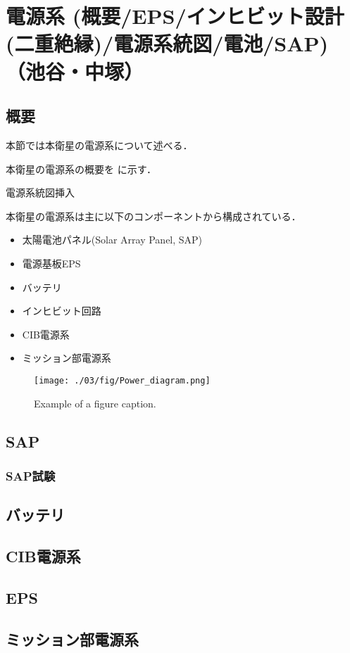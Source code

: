 \section{電源系 (概要/EPS/インヒビット設計(二重絶縁)/電源系統図/電池/SAP)（池谷・中塚）}
\subsection{概要}
本節では本衛星の電源系について述べる．

本衛星の電源系の概要を
に示す．

電源系統図挿入

本衛星の電源系は主に以下のコンポーネントから構成されている．
\begin{itemize}
	\item 太陽電池パネル(Solar Array Panel, SAP)
	\item 電源基板EPS
	\item バッテリ
	\item インヒビット回路
	\item CIB電源系
	\item ミッション部電源系
\end{itemize}


\begin{landscape}
\begin{figure}[htbp]
	\begin{center}
		\texttt{[image: ./03/fig/Power\_diagram.png]}
		\caption{Example of a figure caption.}
		\label{mir}
	\end{center}
\end{figure}
\end{landscape}            


\subsection{SAP}

\subsubsection{SAP試験}

\subsection{バッテリ}


\subsection{CIB電源系}

\subsection{EPS}


\subsection{ミッション部電源系}